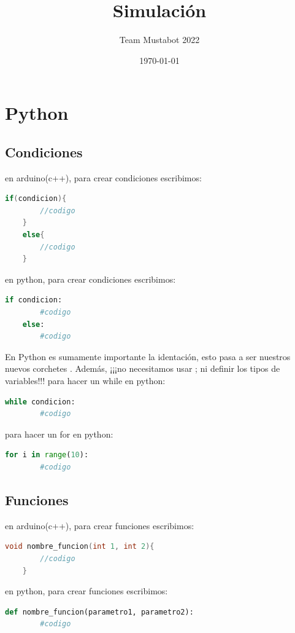 \documentclass[12pt]{article}
\begin{document}
\title{Simulación}
\author{Team Mustabot 2022}
\date{\today}
\maketitle

\section*{Python}
\subsection{Condiciones}
en arduino(c++), para crear condiciones escribimos:
\begin{lstlisting}[language=C++]
    if(condicion){
        //codigo
    }
    else{
        //codigo
    }
\end{lstlisting}
en python, para crear condiciones escribimos:
\begin{lstlisting}[language=Python]
    if condicion:
        #codigo
    else:
        #codigo
\end{lstlisting}
En Python es sumamente importante la identación, esto pasa a ser nuestros nuevos corchetes {}. Además, ¡¡¡no necesitamos usar ; ni definir los tipos de variables!!!
para hacer un while en python:
\begin{lstlisting}[language=Python]
    while condicion:
        #codigo
\end{lstlisting}
para hacer un for en python:
\begin{lstlisting}[language=Python]
    for i in range(10):
        #codigo
\end{lstlisting}
\subsection{Funciones}
en arduino(c++), para crear funciones escribimos:
\begin{lstlisting}[language=C++]
    void nombre_funcion(int 1, int 2){
        //codigo
    }
\end{lstlisting}
en python, para crear funciones escribimos:
\begin{lstlisting}[language=Python]
    def nombre_funcion(parametro1, parametro2):
        #codigo
\end{lstlisting}
\end{document}
